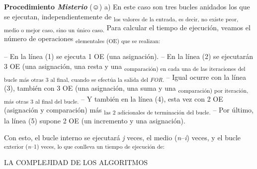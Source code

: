 \documentclass[12pt]{article}
\renewcommand{\_}{\kern-1.5pt\textunderscore\kern-1.5pt}
\begin{document}
\begin{adjustwidth}{0.58in}{0.57in}
\begin{justify}
{\fontsize{10pt}{12.0pt}\selectfont \textbf{Procedimiento \textit{Misterio }}(☺) a) En este caso son tres bucles anidados los que se ejecutan, independientemente de \textsubscript{los valores de la entrada, es decir, no existe peor, medio o mejor caso, sino un único caso. }Para calcular el tiempo de ejecución, veamos el número de operaciones \textsubscript{elementales (OE) que se realizan: }\par}
\end{justify}\par

\end{adjustwidth}

\begin{adjustwidth}{0.58in}{0.57in}
{\fontsize{10pt}{12.0pt}\selectfont – En la línea (1) se ejecuta 1 OE (una asignación). – En la línea (2) se ejecutarán 3 OE (una asignación, una resta y una \textsubscript{comparación) en cada una de las iteraciones del bucle más otras 3 al final, cuando se efectúa la salida del \textit{FOR}. }– Igual ocurre con la línea (3), también con 3 OE (una asignación, una suma y una \textsubscript{comparación) por iteración, más otras 3 al final del bucle. }– Y también en la línea (4), esta vez con 2 OE (asignación y comparación) más \textsubscript{las 2 adicionales de terminación del bucle. }– Por último, la línea (5) supone 2 OE (un incremento y una asignación). \par}\par

\end{adjustwidth}

\begin{adjustwidth}{0.58in}{0.57in}
{\fontsize{10pt}{12.0pt}\selectfont Con esto, el bucle interno se ejecutará \textit{j }veces, el medio (\textit{n}–\textit{i}) veces, y el bucle \textsubscript{exterior (\textit{n}–1) veces, lo que conlleva un tiempo de ejecución de: }\par}\par

\end{adjustwidth}

{\fontsize{7pt}{8.4pt}\selectfont LA COMPLEJIDAD DE LOS ALGORITMOS {\fontsize{10pt}{12.0pt} \par}\par}\par
\end{document}
